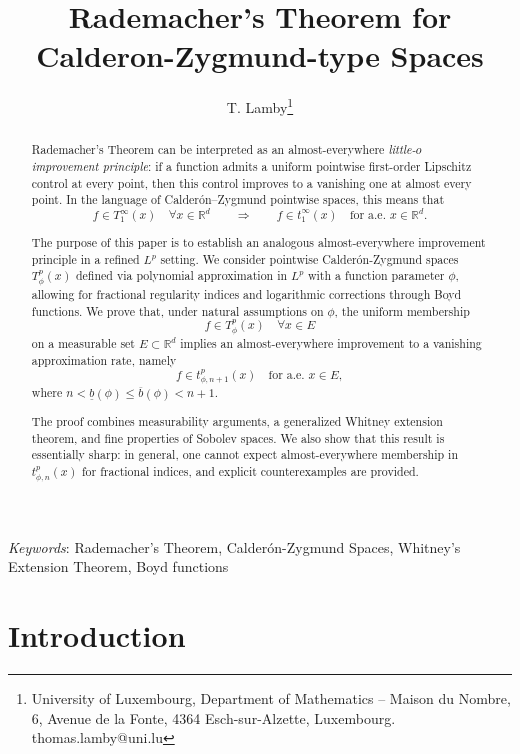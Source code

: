 \documentclass[a4paper,10pt]{article}
\title{Rademacher's Theorem for Calderon-Zygmund-type Spaces}
\author{T. Lamby\footnote{University of Luxembourg, Department of Mathematics -- Maison du Nombre, 6, Avenue de la Fonte, 4364 Esch-sur-Alzette, Luxembourg. thomas.lamby@uni.lu}}
\theoremstyle{thmstyleone}%
\theoremstyle{thmstyletwo}%
\theoremstyle{thmstylethree}%
\begin{document}
\maketitle

\begin{abstract}
Rademacher's Theorem can be interpreted as an almost-everywhere \emph{little-$o$ improvement principle}: if a function admits a uniform pointwise first-order Lipschitz control at every point, then this control improves to a vanishing one at almost every point. In the language of Calder\'on--Zygmund pointwise spaces, this means that
\[
f \in T^\infty_1(x) \quad \forall x \in \mathbb{R}^d
\qquad \Longrightarrow \qquad
f \in t^\infty_1(x) \quad \text{for a.e. } x \in \mathbb{R}^d.
\]

The purpose of this paper is to establish an analogous almost-everywhere improvement principle in a refined $L^p$ setting. We consider pointwise Calder\'on-Zygmund spaces $T^p_{\phi}(x)$ defined via polynomial approximation in $L^p$ with a function parameter $\phi$, allowing for fractional regularity indices and logarithmic corrections through Boyd functions. We prove that, under natural assumptions on $\phi$, the uniform membership
\[
f \in T^p_{\phi}(x) \quad \forall x \in E
\]
on a measurable set $E \subset \mathbb{R}^d$ implies an almost-everywhere improvement to a vanishing approximation rate, namely
\[
f \in t^p_{\phi,n+1}(x) \quad \text{for a.e. } x \in E,
\]
where $n < \underline{b}(\phi) \leq \overline{b}(\phi) < n+1$.

The proof combines measurability arguments, a generalized Whitney extension theorem, and fine properties of Sobolev spaces. We also show that this result is essentially sharp: in general, one cannot expect almost-everywhere membership in $t^p_{\phi,n}(x)$ for fractional indices, and explicit counterexamples are provided.
\end{abstract}

\noindent \textit{Keywords}: Rademacher's Theorem, Calder\'on-Zygmund Spaces, Whitney's Extension Theorem, Boyd functions




\section{Introduction}\label{sec1}
\end{document}

